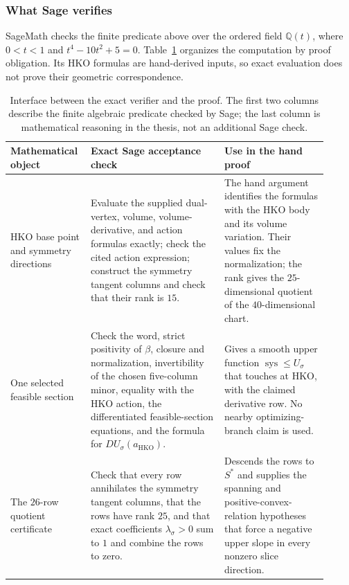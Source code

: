 \subsubsection*{What Sage verifies}

SageMath checks the finite predicate above over the ordered field
\(\mathbb Q(t)\), where \(0<t<1\) and \(t^4-10t^2+5=0\).
Table~\ref{tab:hko-verification-interface} organizes the computation by proof
obligation.  Its HKO formulas are hand-derived inputs, so exact evaluation does
not prove their geometric correspondence.

\begin{table}[!ht]
\centering
\small
\begin{tabular}{@{}p{0.20\linewidth}p{0.40\linewidth}p{0.31\linewidth}@{}}
\toprule
Mathematical object & Exact Sage acceptance check & Use in the hand proof \\
\midrule
HKO base point and symmetry directions
& Evaluate the supplied dual-vertex, volume, volume-derivative, and action
  formulas exactly; check the cited action expression; construct the symmetry
  tangent columns and check that their rank is \(15\).
& The hand argument identifies the formulas with the HKO body and its volume
  variation.  Their values fix the normalization; the rank gives the
  \(25\)-dimensional quotient of the \(40\)-dimensional chart. \\
\addlinespace
One selected feasible section
& Check the word, strict positivity of \(\beta\), closure and normalization,
  invertibility of the chosen five-column minor, equality with the HKO
  action, the differentiated feasible-section equations, and the formula for
  \(DU_\sigma(a_{\mathrm{HKO}})\).
& Gives a smooth upper function
  \(\operatorname{sys}\leq U_\sigma\) that touches at HKO, with the claimed
  derivative row.  No nearby optimizing-branch claim is used. \\
\addlinespace
The \(26\)-row quotient certificate
& Check that every row annihilates the symmetry tangent columns, that the rows
  have rank \(25\), and that exact coefficients \(\lambda_\sigma>0\) sum to
  \(1\) and combine the rows to zero.
& Descends the rows to \(S^*\) and supplies the spanning and positive-convex-
  relation hypotheses that force a negative upper slope in every nonzero
  slice direction. \\
\bottomrule
\end{tabular}
\caption{Interface between the exact verifier and the proof.  The first two
columns describe the finite algebraic predicate checked by Sage; the last
column is mathematical reasoning in the thesis, not an additional Sage
check.}
\label{tab:hko-verification-interface}
\end{table}

